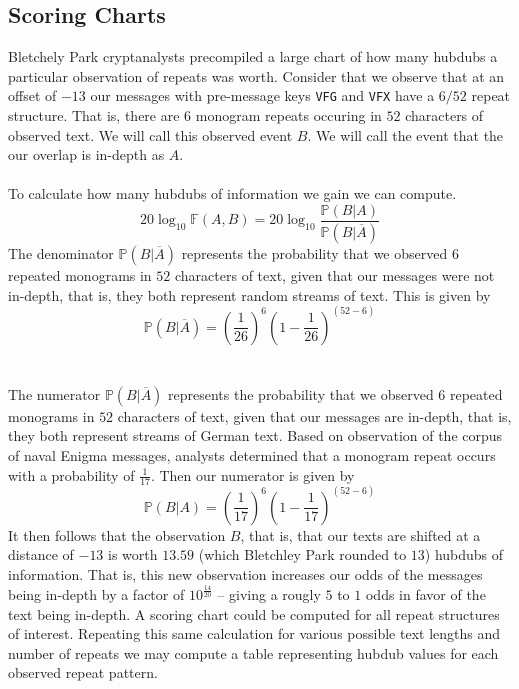 \subsection{Scoring Charts}
Bletchely Park cryptanalysts precompiled a large chart of how many
hubdubs a particular observation of repeats was worth. Consider
that we observe that at an offset of $-13$ our messages with
pre-message keys \texttt{VFG} and \texttt{VFX} have a $6/52$ repeat
structure. That is, there are $6$ monogram repeats occuring in $52$
characters of observed text. We will call this observed event $B$.
We will call the event that the our overlap is in-depth as $A$.
\\\\To calculate how many hubdubs of information we gain we can compute.
\[
	20\log_{10}\mathbb{F}(A,B) =
	20\log_{10}\frac{\mathbb{P}(B|A)}{\mathbb{P}(B|\overline{A})}
\]
The denominator $\mathbb{P}(B|\overline{A})$ represents the
probability that we observed $6$ repeated monograms in $52$
characters of text, given that our messages were not in-depth, that
is, they both represent random streams of text. This is given by
\[
	\mathbb{P}(B|\overline{A}) = (\frac{1}{26})^6(1-\frac{1}{26})^{(52-6)}
\]
\\\\The numerator $\mathbb{P}(B|\overline{A})$ represents the
probability that we observed $6$ repeated monograms in $52$
characters of text, given that our messages are in-depth, that is,
they both represent streams of German text. Based on observation of
the corpus of naval Enigma messages, analysts determined that a
monogram repeat occurs with a probability of $\frac{1}{17}$. Then
our numerator is given by
\[
	\mathbb{P}(B|A) = (\frac{1}{17})^6(1-\frac{1}{17})^{(52-6)}
\]
It then follows that the observation $B$, that is, that our texts
are shifted at a distance of $-13$ is worth $13.59$ (which
Bletchley Park rounded to $13$) hubdubs of information. That is,
this new observation increases our odds of the messages being
in-depth by a factor of $10^\frac{14}{20}$ -- giving a rougly $5$
to $1$ odds in favor of the text being in-depth. A scoring chart
could be computed for all repeat structures of interest. Repeating
this same calculation for various possible text lengths and number
of repeats we may compute a table representing hubdub values for
each observed repeat pattern.
